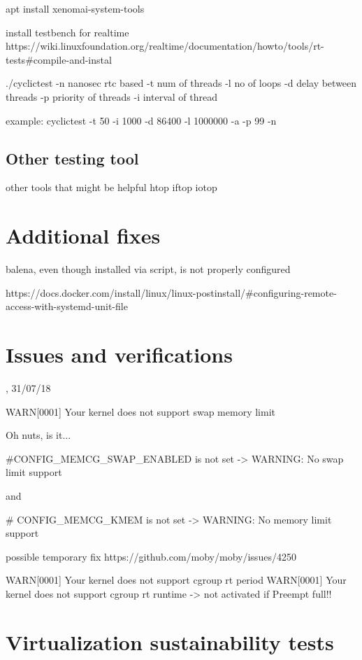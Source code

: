 \documentclass[]{scrartcl}
\begin{document}
apt install xenomai-system-tools

install testbench for realtime
https://wiki.linuxfoundation.org/realtime/documentation/howto/tools/rt-tests#compile-and-instal



./cyclictest 
-n nanosec rtc based
-t num of threads
-l no of loops
-d delay between threads
-p priority of threads
-i interval of thread


example: 
cyclictest -t 50 -i 1000 -d 86400 -l 1000000 -a -p 99 -n

\subsection{Other testing tool}

other tools that might be helpful
htop
iftop
iotop


\section{Additional fixes}

balena, even though installed via script, is not properly configured

https://docs.docker.com/install/linux/linux-postinstall/#configuring-remote-access-with-systemd-unit-file


\section{Issues and verifications}

{\small\textsc{, 31/07/18} \bigskip}



WARN[0001] Your kernel does not support swap memory limit 

Oh nuts, is it...

#CONFIG_MEMCG_SWAP_ENABLED is not set -> WARNING: No swap limit support

and

# CONFIG_MEMCG_KMEM is not set -> WARNING: No memory limit support

possible temporary fix https://github.com/moby/moby/issues/4250



WARN[0001] Your kernel does not support cgroup rt period 
WARN[0001] Your kernel does not support cgroup rt runtime 
-> not activated if Preempt full!!

\section{Virtualization sustainability tests}
\end{document}
